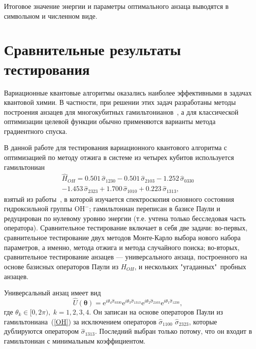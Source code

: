 \documentclass[a4paper]{report}
\begin{document}
Итоговое значение энергии и параметры оптимального анзаца выводятся в символьном и численном виде.


\section{Сравнительные результаты тестирования}

Вариационные квантовые алгоритмы оказались наиболее эффективными в задачах квантовой химии. В частности, при решении этих задач разработаны методы построения анзацев для многокубитных гамильтонианов~\cite{Kandala2017, Aspuru-Guzik2005, Daskin2014, Romero2018}, а для классической оптимизации целевой функции обычно применяются варианты метода градиентного спуска.

В данной работе для тестирования вариационного квантового алгоритма с оптимизацией по методу отжига в системе из четырех кубитов используется гамильтониан
\begin{multline}\label{OH}
\hat{H}_{\scriptscriptstyle OH} = 0.501\,\hat{\sigma}_{1230} - 0.501\,\hat{\sigma}_{2103} - 1.252\,\hat{\sigma}_{0330} \\
- 1.453\,\hat{\sigma}_{2323} + 1.700\,\hat{\sigma}_{1010} + 0.223\,\hat{\sigma}_{1313},\quad
\end{multline}
взятый из работы~\cite{Cawley2013}, в которой изучается спектроскопия основного состояния гидроксильной группы $\mathrm{OH}^-$; гамильтониан переписан в базисе Паули и редуцирован по нулевому уровню энергии (т.е. учтена только бесследовая часть оператора). Сравнительное тестирование включает в себя две задачи: во-первых, сравнительное тестирование двух методов Монте-Карло выбора нового набора параметров, а именно, метода отжига и метода случайного поиска; во-вторых, сравнительное тестирование анзацев --- универсального анзаца, построенного на основе базисных операторов Паули из $\hat{H}_{\scriptscriptstyle OH}$, и нескольких "угаданных"\, пробных анзацев.

Универсальный анзац имеет вид
\begin{equation}\label{ansatz-OH}
\hat{U}(\bm\theta)= \mathrm{e}^{i\theta_4\hat{\sigma}_{0330}} \mathrm{e}^{i\theta_3\hat{\sigma}_{1313}} \mathrm{e}^{i\theta_2\hat{\sigma}_{2103}} \mathrm{e}^{i\theta_1\hat{\sigma}_{1230}},
\end{equation}
где $\theta_k\in[0,2\pi),\; k=1,2,3,4$. Он записан на основе операторов Паули из гамильтониана~(\ref{OH}) за исключением операторов $\hat{\sigma}_{1100}$   $\hat{\sigma}_{2323}$, которые дублируются оператором $\hat{\sigma}_{1313}$. Последний выбран только потому, что он входит в гамильтониан с минимальным коэффициентом.
\end{document}
